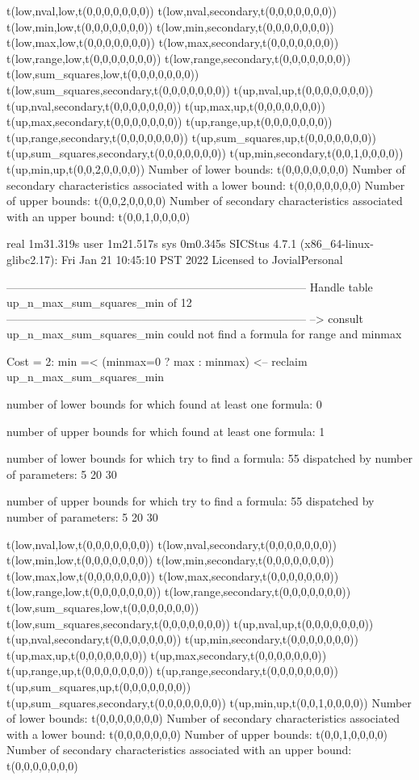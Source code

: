t(low,nval,low,t(0,0,0,0,0,0,0))
t(low,nval,secondary,t(0,0,0,0,0,0,0))
t(low,min,low,t(0,0,0,0,0,0,0))
t(low,min,secondary,t(0,0,0,0,0,0,0))
t(low,max,low,t(0,0,0,0,0,0,0))
t(low,max,secondary,t(0,0,0,0,0,0,0))
t(low,range,low,t(0,0,0,0,0,0,0))
t(low,range,secondary,t(0,0,0,0,0,0,0))
t(low,sum_squares,low,t(0,0,0,0,0,0,0))
t(low,sum_squares,secondary,t(0,0,0,0,0,0,0))
t(up,nval,up,t(0,0,0,0,0,0,0))
t(up,nval,secondary,t(0,0,0,0,0,0,0))
t(up,max,up,t(0,0,0,0,0,0,0))
t(up,max,secondary,t(0,0,0,0,0,0,0))
t(up,range,up,t(0,0,0,0,0,0,0))
t(up,range,secondary,t(0,0,0,0,0,0,0))
t(up,sum_squares,up,t(0,0,0,0,0,0,0))
t(up,sum_squares,secondary,t(0,0,0,0,0,0,0))
t(up,min,secondary,t(0,0,1,0,0,0,0))
t(up,min,up,t(0,0,2,0,0,0,0))
Number of lower bounds:                                             t(0,0,0,0,0,0,0)
Number of secondary characteristics associated with a lower bound:  t(0,0,0,0,0,0,0)
Number of upper bounds:                                             t(0,0,2,0,0,0,0)
Number of secondary characteristics associated with an upper bound: t(0,0,1,0,0,0,0)

real	1m31.319s
user	1m21.517s
sys	0m0.345s
SICStus 4.7.1 (x86_64-linux-glibc2.17): Fri Jan 21 10:45:10 PST 2022
Licensed to JovialPersonal


--------------------------------------------------------------------------------
Handle table up_n_max_sum_squares_min of 12
--------------------------------------------------------------------------------
--> consult up_n_max_sum_squares_min
could not find a formula for range and minmax

Cost =  2:  min =< (minmax=0 ? max : minmax)
<-- reclaim up_n_max_sum_squares_min

number of lower bounds for which found at least one formula: 0

number of upper bounds for which found at least one formula: 1

number of lower bounds for which try to find a formula: 55
dispatched by number of parameters: 5  20  30

number of upper bounds for which try to find a formula: 55
dispatched by number of parameters: 5  20  30

t(low,nval,low,t(0,0,0,0,0,0,0))
t(low,nval,secondary,t(0,0,0,0,0,0,0))
t(low,min,low,t(0,0,0,0,0,0,0))
t(low,min,secondary,t(0,0,0,0,0,0,0))
t(low,max,low,t(0,0,0,0,0,0,0))
t(low,max,secondary,t(0,0,0,0,0,0,0))
t(low,range,low,t(0,0,0,0,0,0,0))
t(low,range,secondary,t(0,0,0,0,0,0,0))
t(low,sum_squares,low,t(0,0,0,0,0,0,0))
t(low,sum_squares,secondary,t(0,0,0,0,0,0,0))
t(up,nval,up,t(0,0,0,0,0,0,0))
t(up,nval,secondary,t(0,0,0,0,0,0,0))
t(up,min,secondary,t(0,0,0,0,0,0,0))
t(up,max,up,t(0,0,0,0,0,0,0))
t(up,max,secondary,t(0,0,0,0,0,0,0))
t(up,range,up,t(0,0,0,0,0,0,0))
t(up,range,secondary,t(0,0,0,0,0,0,0))
t(up,sum_squares,up,t(0,0,0,0,0,0,0))
t(up,sum_squares,secondary,t(0,0,0,0,0,0,0))
t(up,min,up,t(0,0,1,0,0,0,0))
Number of lower bounds:                                             t(0,0,0,0,0,0,0)
Number of secondary characteristics associated with a lower bound:  t(0,0,0,0,0,0,0)
Number of upper bounds:                                             t(0,0,1,0,0,0,0)
Number of secondary characteristics associated with an upper bound: t(0,0,0,0,0,0,0)

